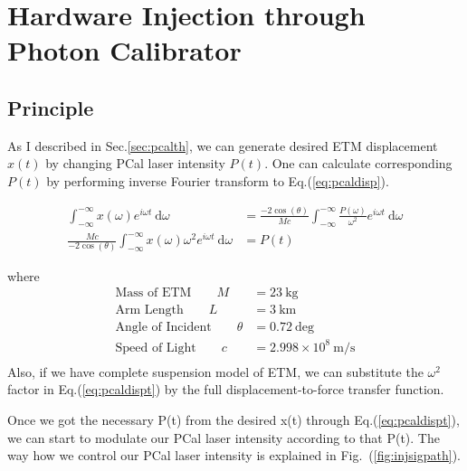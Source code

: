 
\chapter{Hardware Injection through Photon Calibrator}
\section{Principle}



 
 As I described in Sec.\ref{sec:pcalth}, we can generate desired ETM displacement $x(t)$ by changing PCal laser intensity $P(t)$. One can calculate corresponding $P(t)$ by performing inverse Fourier transform to Eq.(\ref{eq:pcaldisp}).
 
\begin{align}
    \int_{-\infty}^{-\infty} x(\omega) e^{i \omega t} ~\mathrm{d} \omega &= 
     \frac{-2   \cos(\theta)}{Mc} 
     \int_{-\infty}^{-\infty}\frac{P(\omega)}{\omega^2} e^{i \omega t} ~\mathrm{d} \omega \\
\label{eq:pcaldispt}
    \frac{Mc}{-2 \cos(\theta)} \int_{-\infty}^{-\infty}
     x(\omega) \omega^2 e^{i \omega t} ~\mathrm{d} \omega 
&= P(t) 
\end{align}

where
\begin{align*}
   \text{Mass of ETM} \qquad  M &= 23 ~\mathrm{kg} \\
   \text{Arm Length} \qquad   L &= 3 ~\mathrm{km}  \\
   \text{Angle of Incident} \qquad   \theta &= 0.72 ~\mathrm{deg}  \\
   \text{Speed of Light} \qquad   c &= 2.998\times10^8 ~\mathrm{m/s} \\
\end{align*}
Also, if we have complete suspension model of ETM, we can substitute the $\omega^2$ factor in Eq.(\ref{eq:pcaldispt}) by the full displacement-to-force transfer function.

Once we got the necessary P(t) from the desired x(t) through Eq.(\ref{eq:pcaldispt}), we can start to modulate our PCal laser intensity according to that P(t). The way how we control our PCal laser intensity is explained in Fig.~(\ref{fig:injsigpath}).


